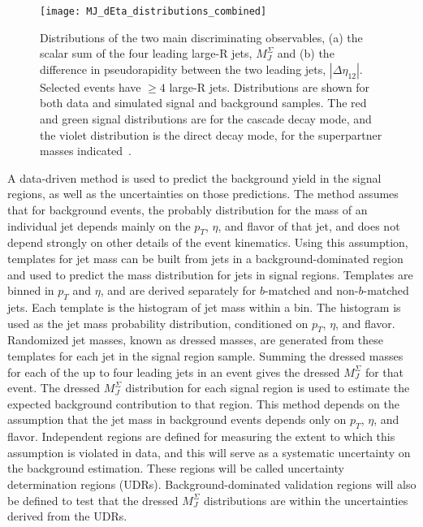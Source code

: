\begin{figure}[!ht]
    \centering
    \texttt{[image: MJ\_dEta\_distributions\_combined]}
    \caption{Distributions of the two main discriminating observables, (a) the scalar sum of the four leading large-R jets, $M_{J}^{\Sigma}$ and (b) the difference in pseudorapidity between the two leading jets, $|\Delta\eta_{12}|$.
    Selected events have $\geq 4$ large-R jets.
    Distributions are shown for both data and simulated signal and background samples.
    The red and green signal distributions are for the cascade decay mode, and the violet distribution is the direct decay mode, for the superpartner masses indicated~\cite{paper-plb}.}
    \label{fig:MJ_dEta_distributions}
\end{figure}

A data-driven method is used to predict the background yield in the signal regions, as well as the uncertainties on those predictions.
The method assumes that for background events, the probably distribution for the mass of an individual jet depends mainly on the $p_{T}$, $\eta$, and flavor of that jet, and does not depend strongly on other details of the event kinematics.
Using this assumption, templates for jet mass can be built from jets in a background-dominated region and used to predict the mass distribution for jets in signal regions.
Templates are binned in $p_{T}$ and $\eta$, and are derived separately for $b$-matched and non-$b$-matched jets.
Each template is the histogram of jet mass within a bin.
The histogram is used as the jet mass probability distribution, conditioned on $p_{T}$, $\eta$, and flavor.
Randomized jet masses, known as dressed masses, are generated from these templates for each jet in the signal region sample.
Summing the dressed masses for each of the up to four leading jets in an event gives the dressed $M_{J}^{\Sigma}$ for that event.
The dressed $M_{J}^{\Sigma}$ distribution for each signal region is used to estimate the expected background contribution to that region.
This method depends on the assumption that the jet mass in background events depends only on $p_{T}$, $\eta$, and flavor.
Independent regions are defined for measuring the extent to which this assumption is violated in data, and this will serve as a systematic uncertainty on the background estimation.
These regions will be called uncertainty determination regions (UDRs).
Background-dominated validation regions will also be defined to test that the dressed $M_{J}^{\Sigma}$ distributions are within the uncertainties derived from the UDRs.

